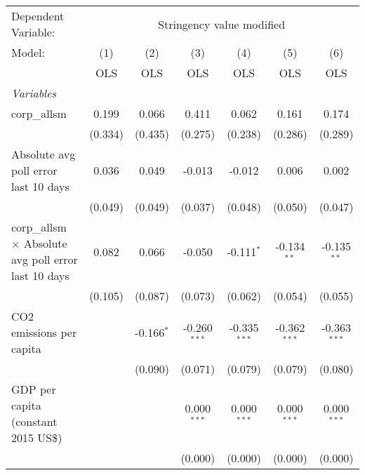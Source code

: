 
\begingroup
\centering
\begin{tabular}{lcccccc}
   \toprule
   Dependent Variable: & \multicolumn{6}{c}{Stringency value modified}\\
   Model:                                                      & (1)     & (2)          & (3)            & (4)            & (5)            & (6)\\  
                                                               &  OLS    & OLS          & OLS            & OLS            & OLS            & OLS\\  
   \midrule
   \emph{Variables}\\
   corp\_allsm                                                 & 0.199   & 0.066        & 0.411          & 0.062          & 0.161          & 0.174\\   
                                                               & (0.334) & (0.435)      & (0.275)        & (0.238)        & (0.286)        & (0.289)\\   
   Absolute avg poll error last 10 days                        & 0.036   & 0.049        & -0.013         & -0.012         & 0.006          & 0.002\\   
                                                               & (0.049) & (0.049)      & (0.037)        & (0.048)        & (0.050)        & (0.047)\\   
   corp\_allsm $\times$ Absolute avg poll error last 10 days   & 0.082   & 0.066        & -0.050         & -0.111$^{*}$   & -0.134$^{**}$  & -0.135$^{**}$\\   
                                                               & (0.105) & (0.087)      & (0.073)        & (0.062)        & (0.054)        & (0.055)\\   
   CO2 emissions per capita                                    &         & -0.166$^{*}$ & -0.260$^{***}$ & -0.335$^{***}$ & -0.362$^{***}$ & -0.363$^{***}$\\   
                                                               &         & (0.090)      & (0.071)        & (0.079)        & (0.079)        & (0.080)\\   
   GDP per capita (constant 2015 US\$)                         &         &              & 0.000$^{***}$  & 0.000$^{***}$  & 0.000$^{***}$  & 0.000$^{***}$\\   
                                                               &         &              & (0.000)        & (0.000)        & (0.000)        & (0.000)\\   

\end{tabular}
